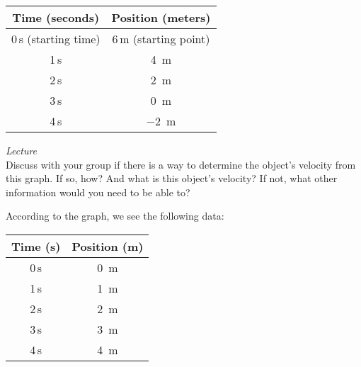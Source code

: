 \documentclass[dvipsnames]{exam}
\begin{document}
\begin{questions}
\begin{parts}
    \begin{solution}
        \begin{center}
        \begin{tabular}{|c|c|}
            \hline
             \textbf{Time (seconds)} & \textbf{Position (meters)} \\ \hline
             0\,s (starting time) & 6\,m (starting point) \\ \hline
             1\,s & \SI{4}{m} \\ \hline
             2\,s & \SI{2}{m} \\ \hline
             3\,s & \SI{0}{m} \\  \hline
             4\,s & \SI{-2}{m} \\ \hline
        \end{tabular}
    \end{center}
    \end{solution}
\end{parts}

\question
\textit{Lecture}\\
Discuss with your group if there is a way to determine the object's velocity from this graph. If so, how? And what is this object’s velocity? If not, what other information would you need to be able to?

\begin{center}
\end{center}

\begin{solution}
    According to the graph, we see the following data:

    \begin{center}
        \begin{tabular}{|c|c|}
            \hline
             \textbf{Time (s)} & \textbf{Position (m)} \\ \hline
             0\,s & \SI{0}{m} \\ \hline
             1\,s & \SI{1}{m} \\ \hline
             2\,s & \SI{2}{m} \\ \hline
             3\,s & \SI{3}{m} \\  \hline
             4\,s & \SI{4}{m} \\ \hline
        \end{tabular}
    \end{center}


\end{solution}
\end{questions}
\end{document}
